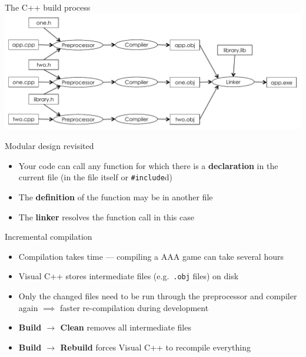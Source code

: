 \begin{frame}[fragile]{The C++ build process}
    \includegraphics[width=\textwidth]{compiler_flowchart.pdf}
\end{frame}

\begin{frame}[fragile]{Modular design revisited}
    \begin{itemize}
        \item Your code can call any function for which there is a \textbf{declaration} in the current file
            (in the file itself or \lstinline{#include}d) \pause
        \item The \textbf{definition} of the function may be in another file \pause
        \item The \textbf{linker} resolves the function call in this case
    \end{itemize}
\end{frame}

\begin{frame}[fragile]{Incremental compilation}
    \begin{itemize}
        \item Compilation takes time --- compiling a AAA game can take several hours \pause
        \item Visual C++ stores intermediate files (e.g.\ \texttt{.obj} files) on disk \pause
        \item Only the changed files need to be run through the preprocessor and compiler again
            $\implies$ faster re-compilation during development \pause
        \item \textbf{Build $\to$ Clean} removes all intermediate files \pause
        \item \textbf{Build $\to$ Rebuild} forces Visual C++ to recompile everything
    \end{itemize}
\end{frame}

